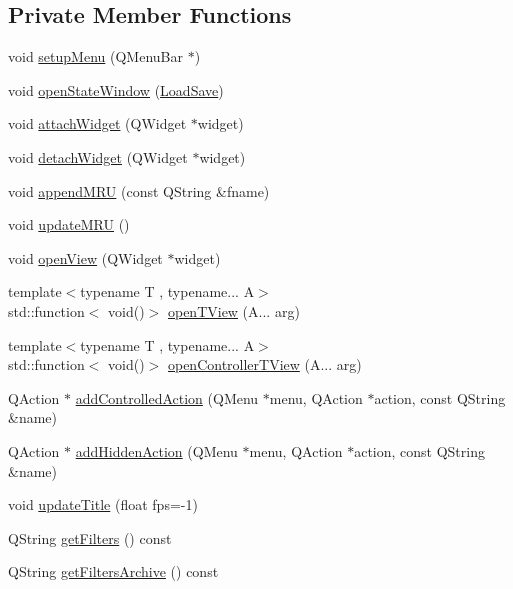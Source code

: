 \subsection*{Private Member Functions}
\begin{DoxyCompactItemize}
\item 
void \mbox{\hyperlink{class_q_g_b_a_1_1_window_a529d32e64893056a7307db1ccfd10df9}{setup\+Menu}} (Q\+Menu\+Bar $\ast$)
\item 
void \mbox{\hyperlink{class_q_g_b_a_1_1_window_a830974740cbfbd017c09eeb45df41c04}{open\+State\+Window}} (\mbox{\hyperlink{namespace_q_g_b_a_a7943e4735d6f412e1479e456e6f4aca2}{Load\+Save}})
\item 
void \mbox{\hyperlink{class_q_g_b_a_1_1_window_ab2307df8cc2d23a22d78d2e3fbc71fde}{attach\+Widget}} (Q\+Widget $\ast$widget)
\item 
void \mbox{\hyperlink{class_q_g_b_a_1_1_window_a1bc29e54dc3b7153e30eeeb575dc12fa}{detach\+Widget}} (Q\+Widget $\ast$widget)
\item 
void \mbox{\hyperlink{class_q_g_b_a_1_1_window_af4bbf2742217f6075a7768fb3042ff31}{append\+M\+RU}} (const Q\+String \&fname)
\item 
void \mbox{\hyperlink{class_q_g_b_a_1_1_window_ac9d1c0d541f7088a9595e3a6bbb7992a}{update\+M\+RU}} ()
\item 
void \mbox{\hyperlink{class_q_g_b_a_1_1_window_a0543c9726f3fd0a9d312aef0c741e296}{open\+View}} (Q\+Widget $\ast$widget)
\item 
{\footnotesize template$<$typename T , typename... A$>$ }\\std\+::function$<$ void()$>$ \mbox{\hyperlink{class_q_g_b_a_1_1_window_ab4bbc62ad6d07c39fab46adbc81086e5}{open\+T\+View}} (A... arg)
\item 
{\footnotesize template$<$typename T , typename... A$>$ }\\std\+::function$<$ void()$>$ \mbox{\hyperlink{class_q_g_b_a_1_1_window_a3660e2956b324697fecf11b138e832f0}{open\+Controller\+T\+View}} (A... arg)
\item 
Q\+Action $\ast$ \mbox{\hyperlink{class_q_g_b_a_1_1_window_ac79df84a0768a432e4872f68a03e96e6}{add\+Controlled\+Action}} (Q\+Menu $\ast$menu, Q\+Action $\ast$action, const Q\+String \&name)
\item 
Q\+Action $\ast$ \mbox{\hyperlink{class_q_g_b_a_1_1_window_a3ab387305397be7854469d5060e678db}{add\+Hidden\+Action}} (Q\+Menu $\ast$menu, Q\+Action $\ast$action, const Q\+String \&name)
\item 
void \mbox{\hyperlink{class_q_g_b_a_1_1_window_afdf62686722f2d43b8efc1932f545f5a}{update\+Title}} (float fps=-\/1)
\item 
Q\+String \mbox{\hyperlink{class_q_g_b_a_1_1_window_a6deb2c5ee22e8538d5ca27be1a342a05}{get\+Filters}} () const
\item 
Q\+String \mbox{\hyperlink{class_q_g_b_a_1_1_window_a2b48734321435443a6df97c091700a2e}{get\+Filters\+Archive}} () const
\end{DoxyCompactItemize}
